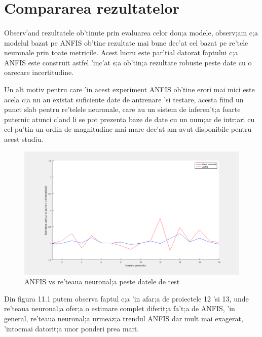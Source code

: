 \section{Compararea rezultatelor}

\paragraph{}

Observ'and rezultatele ob'tinute prin evaluarea celor dou;a modele, observ;am c;a modelul bazat pe ANFIS ob'tine rezultate mai bune dec'at cel bazat pe re'tele neuronale prin toate metricile. Acest lucru este par'tial datorat faptului c;a ANFIS este construit astfel 'inc'at s;a ob'tin;a rezultate robuste peste date cu o oarecare incertitudine.
\par
Un alt motiv pentru care 'in acest experiment ANFIS ob'tine erori mai mici este acela c;a nu au existat suficiente date de antrenare 'si testare, acesta fiind un punct slab pentru re'telele neuronale, care au un sistem de inferen't;a foarte puternic atunci c'and li se pot prezenta baze de date cu un num;ar de intr;ari cu cel pu'tin un ordin de magnitudine mai mare dec'at am avut disponibile pentru acest studiu.
\begin{figure}[!htbp]
\includegraphics[width=\textwidth]{comparison}
\caption{ANFIS vs re'teaua neuronal;a peste datele de test}
\end{figure}
\par
Din figura 11.1 putem observa faptul c;a 'in afar;a de proiectele 12 'si 13, unde re'teaua neuronal;a ofer;a o estimare complet diferit;a fa't;a de ANFIS, 'in general, re'teaua neuronal;a urmeaz;a trendul ANFIS dar mult mai exagerat, 'intocmai datorit;a unor ponderi prea mari.